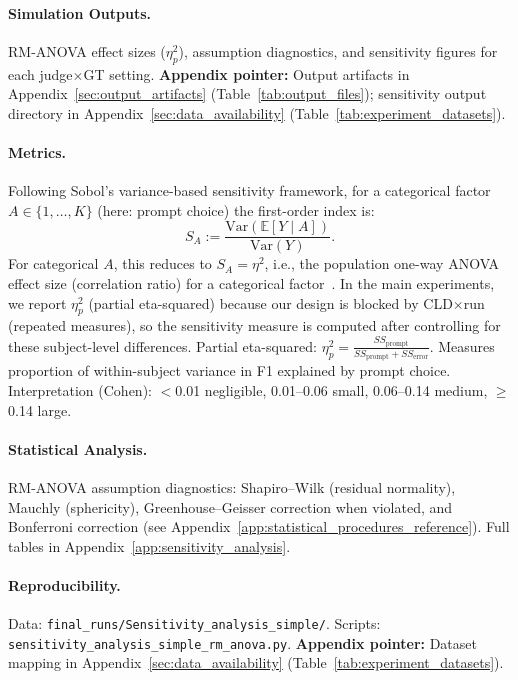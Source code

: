 \paragraph{Simulation Outputs.}
RM-ANOVA effect sizes ($\eta^2_p$), assumption diagnostics, and sensitivity figures for each judge$\times$GT setting.
\textbf{Appendix pointer:} Output artifacts in Appendix~\ref{sec:output_artifacts} (Table~\ref{tab:output_files}); sensitivity output directory in Appendix~\ref{sec:data_availability} (Table~\ref{tab:experiment_datasets}).

\paragraph{Metrics.}
Following Sobol's variance-based sensitivity framework, for a categorical factor $A\in\{1,\dots,K\}$ (here: prompt choice) the first-order index is:
\begin{equation}
S_A := \frac{\mathrm{Var}(\mathbb{E}[Y \mid A])}{\mathrm{Var}(Y)}.
\end{equation}
For categorical $A$, this reduces to $S_A=\eta^2$,
i.e., the population one-way ANOVA effect size (correlation ratio) for a categorical factor~\cite{saltelli2010variance}. In the main
experiments, we report $\eta^2_p$ (partial eta-squared) because our design is blocked by CLD$\times$run (repeated
measures), so the sensitivity measure is computed after controlling for these subject-level differences.
Partial eta-squared: $\eta^2_p = \frac{SS_{\text{prompt}}}{SS_{\text{prompt}} + SS_{\text{error}}}$. Measures proportion of within-subject variance in F1 explained by prompt choice. Interpretation (Cohen): $<$0.01 negligible, 0.01--0.06 small, 0.06--0.14 medium, $\geq$0.14 large.

\paragraph{Statistical Analysis.}
RM-ANOVA assumption diagnostics: Shapiro--Wilk (residual normality), Mauchly (sphericity), Greenhouse--Geisser correction when violated, and Bonferroni correction (see Appendix~\ref{app:statistical_procedures_reference}). Full tables in Appendix~\ref{app:sensitivity_analysis}.

\paragraph{Reproducibility.}
Data: \texttt{final\_runs/Sensitivity\_analysis\_simple/}. Scripts: \texttt{sensitivity\_analysis\_simple\_rm\_anova.py}.
\textbf{Appendix pointer:} Dataset mapping in Appendix~\ref{sec:data_availability} (Table~\ref{tab:experiment_datasets}).


